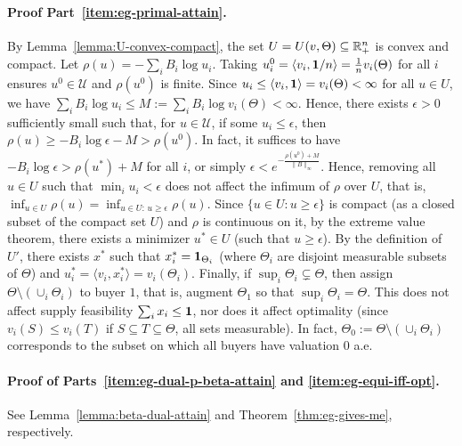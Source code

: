 	\paragraph{Proof Part~\ref{item:eg-primal-attain}.}
	By Lemma~\ref{lemma:U-convex-compact}, the set $U = U(v, \Theta) \subseteq \mathbb{R}_+^n$ is convex and compact. Let $\rho(u) = -\sum_i B_i \log u_i$. Taking $u^0_i = \langle v_i, \mathbf{1}/n \rangle = \frac{1}{n} v_i(\Theta)$ for all $i$ ensures $u^0\in \mathcal{U}$ and $\rho(u^0)$ is finite. Since
	$u_i \leq \langle v_i, \mathbf{1} \rangle = v_i(\Theta) < \infty$
	for all $u\in U$, we have 
	$\sum_i B_i \log u_i \leq M:= \sum_i B_i \log v_i(\Theta) < \infty$.
	Hence, there exists $\epsilon>0$ sufficiently small such that, for $u\in \mathcal{U}$, if some $u_i \leq \epsilon$, then 
	$\rho(u) \geq - B_i \log \epsilon - M > \rho(u^0)$. 
	In fact, it suffices to have $- B_i \log \epsilon > \rho(u^*) + M$ for all $i$, or simply
	$\epsilon < e^{-\frac{\rho(u^0)+M}{\|B\|_\infty}}$.
	Hence, removing all $u\in U$ such that $\min_i u_i < \epsilon$ does not affect the infimum of $\rho$ over $U$, that is, 
	$\inf_{u \in U} \rho(u) = \inf_{u\in U:\, u\geq \epsilon} \rho(u)$.
	Since $\{ u\in U: u\geq \epsilon \}$ is compact (as a closed subset of the compact set $U$) and $\rho$ is continuous on it, by the extreme value theorem, there exists a minimizer $u^*\in U$ (such that $u\geq \epsilon$). 
	By the definition of $U'$, there exists $x^*$ such that $x^*_i = \mathbf{1}_{\Theta_i}$ (where $\Theta_i$ are disjoint measurable subsets of $\Theta$) and
	 $u^*_i = \langle v_i, x^*_i \rangle = v_i(\Theta_i)$.
	Finally, if $\sup_i \Theta_i \subsetneq \Theta$, then assign $\Theta\setminus (\cup_i \Theta_i)$ to buyer $1$, that is, augment $\Theta_1$ so that $\sup_i \Theta_i = \Theta$. This does not affect supply feasibility $\sum_i x_i \leq \mathbf{1}$, nor does it affect optimality (since $v_i(S) \leq v_i(T)$ if $S\subseteq T \subseteq \Theta$, all sets measurable). In fact, $\Theta_0 := \Theta\setminus (\cup_i \Theta_i)$ corresponds to the subset on which all buyers have valuation $0$ a.e.

	\paragraph{Proof of Parts~\ref{item:eg-dual-p-beta-attain} and \ref{item:eg-equi-iff-opt}.} See Lemma~\ref{lemma:beta-dual-attain} and Theorem~\ref{thm:eg-gives-me}, respectively.

